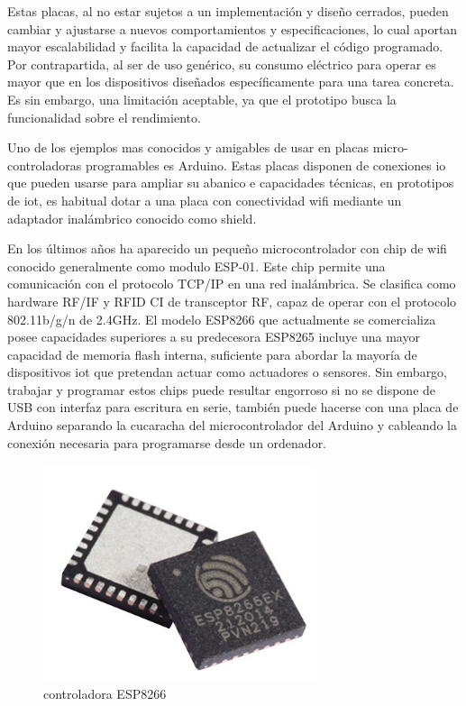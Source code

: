 Estas placas, al no estar sujetos a un implementación y diseño cerrados, pueden cambiar y ajustarse a nuevos comportamientos y especificaciones, lo cual aportan mayor escalabilidad y facilita la capacidad de actualizar el código programado. Por contrapartida, al ser de uso genérico, su consumo eléctrico para operar es mayor que en los dispositivos diseñados específicamente para una tarea concreta. Es sin embargo, una limitación aceptable, ya que el prototipo busca la funcionalidad sobre el rendimiento.

\vspace{1.5cm}

Uno de los ejemplos mas conocidos y amigables de usar en placas micro-controladoras programables es Arduino. Estas placas disponen de conexiones \gls{io} que pueden usarse para ampliar su abanico e capacidades técnicas, en prototipos de \gls{iot}, es habitual dotar a una placa con conectividad \gls{wifi} mediante un adaptador inalámbrico conocido como shield.

\vspace{1.5cm}

En los últimos años ha aparecido un pequeño microcontrolador con chip de \gls{wifi} conocido generalmente como modulo ESP-01. Este chip permite una comunicación con el protocolo TCP/IP en una red inalámbrica. Se clasifica como hardware RF/IF y RFID CI de transceptor RF, capaz de operar con el protocolo 802.11b/g/n de 2.4GHz. El modelo ESP8266 que actualmente se comercializa posee capacidades superiores a su predecesora ESP8265 incluye una mayor capacidad de memoria flash interna, suficiente para abordar la mayoría de dispositivos \gls{iot} que pretendan actuar como actuadores o sensores.
Sin embargo, trabajar y programar estos chips puede resultar engorroso si no se dispone de USB con interfaz para escritura en serie, también puede hacerse con una placa de Arduino separando la cucaracha del microcontrolador del Arduino y cableando la conexión necesaria para programarse desde un ordenador.

\begin{figure}[hbt!]
\centering
\includegraphics[height=2.5in]{figures/esp8266ex.jpg}
\caption[controladora ESP8233]{controladora ESP8266\footnotemark}
\end{figure}


